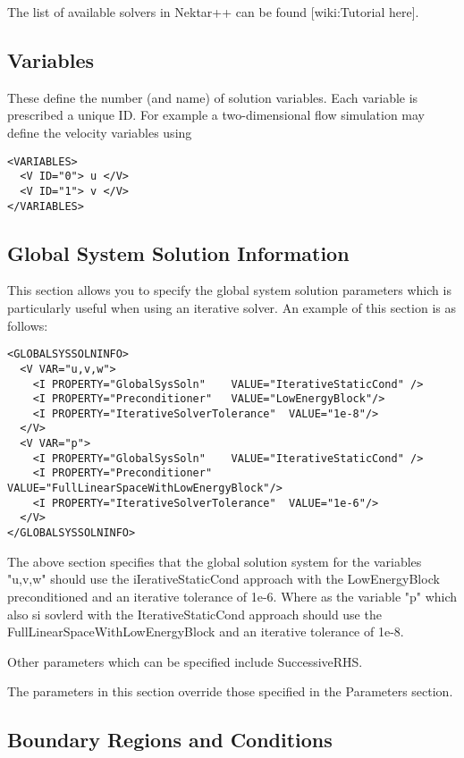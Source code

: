 The list of available solvers in Nektar++ can be found [wiki:Tutorial here].


\subsection{Variables}

These define the number (and name) of solution variables. Each variable is prescribed a unique ID. For example a two-dimensional flow simulation may define the velocity variables  using
\begin{lstlisting}[style=XMLStyle]
<VARIABLES>
  <V ID="0"> u </V>
  <V ID="1"> v </V>
</VARIABLES>
\end{lstlisting}

\subsection{Global System Solution Information}

This section allows you to specify the global system solution parameters which is particularly useful when using an iterative solver. An example of this section is as follows: 

\begin{lstlisting}[style=XMLStyle]
<GLOBALSYSSOLNINFO>
  <V VAR="u,v,w">
    <I PROPERTY="GlobalSysSoln"    VALUE="IterativeStaticCond" />
    <I PROPERTY="Preconditioner"   VALUE="LowEnergyBlock"/>
    <I PROPERTY="IterativeSolverTolerance"  VALUE="1e-8"/>
  </V>
  <V VAR="p">
    <I PROPERTY="GlobalSysSoln"    VALUE="IterativeStaticCond" />
    <I PROPERTY="Preconditioner"   VALUE="FullLinearSpaceWithLowEnergyBlock"/>
    <I PROPERTY="IterativeSolverTolerance"  VALUE="1e-6"/>
  </V>
</GLOBALSYSSOLNINFO>
\end{lstlisting}

The above section specifies that the global solution system for the variables "u,v,w" should use the iIerativeStaticCond approach with the LowEnergyBlock preconditioned and an iterative tolerance of 1e-6.  Where as the variable "p" which also si sovlerd with the IterativeStaticCond approach should use the FullLinearSpaceWithLowEnergyBlock and an iterative tolerance of 1e-8. 

Other parameters which can be specified include SuccessiveRHS. 

The parameters in this section override those specified in the Parameters section. 

\subsection{Boundary Regions and Conditions}

